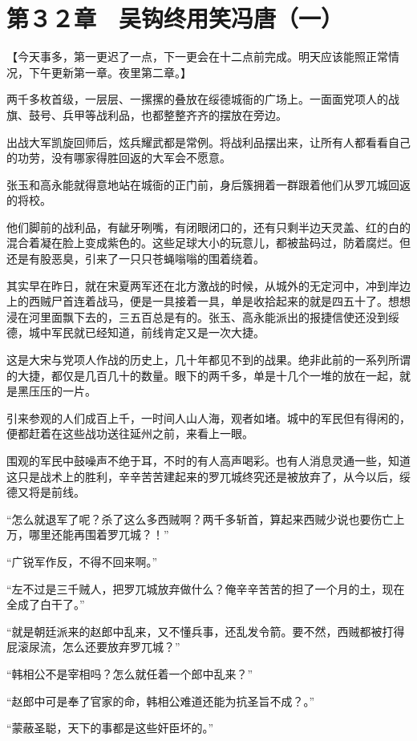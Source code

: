 \section{第３２章　吴钩终用笑冯唐（一）}

【今天事多，第一更迟了一点，下一更会在十二点前完成。明天应该能照正常情况，下午更新第一章。夜里第二章。】

两千多枚首级，一层层、一摞摞的叠放在绥德城衙的广场上。一面面党项人的战旗、鼓号、兵甲等战利品，也都整整齐齐的摆放在旁边。

出战大军凯旋回师后，炫兵耀武都是常例。将战利品摆出来，让所有人都看看自己的功劳，没有哪家得胜回返的大军会不愿意。

张玉和高永能就得意地站在城衙的正门前，身后簇拥着一群跟着他们从罗兀城回返的将校。

他们脚前的战利品，有龇牙咧嘴，有闭眼闭口的，还有只剩半边天灵盖、红的白的混合着凝在脸上变成紫色的。这些足球大小的玩意儿，都被盐码过，防着腐烂。但还是有股恶臭，引来了一只只苍蝇嗡嗡的围着绕着。

其实早在昨日，就在宋夏两军还在北方激战的时候，从城外的无定河中，冲到岸边上的西贼尸首连着战马，便是一具接着一具，单是收拾起来的就是四五十了。想想浸在河里面飘下去的，三五百总是有的。张玉、高永能派出的报捷信使还没到绥德，城中军民就已经知道，前线肯定又是一次大捷。

这是大宋与党项人作战的历史上，几十年都见不到的战果。绝非此前的一系列所谓的大捷，都仅是几百几十的数量。眼下的两千多，单是十几个一堆的放在一起，就是黑压压的一片。

引来参观的人们成百上千，一时间人山人海，观者如堵。城中的军民但有得闲的，便都赶着在这些战功送往延州之前，来看上一眼。

围观的军民中鼓噪声不绝于耳，不时的有人高声喝彩。也有人消息灵通一些，知道这只是战术上的胜利，辛辛苦苦建起来的罗兀城终究还是被放弃了，从今以后，绥德又将是前线。

“怎么就退军了呢？杀了这么多西贼啊？两千多斩首，算起来西贼少说也要伤亡上万，哪里还能再围着罗兀城？！”

“广锐军作反，不得不回来啊。”

“左不过是三千贼人，把罗兀城放弃做什么？俺辛辛苦苦的担了一个月的土，现在全成了白干了。”

“就是朝廷派来的赵郎中乱来，又不懂兵事，还乱发令箭。要不然，西贼都被打得屁滚尿流，怎么还要放弃罗兀城？”

“韩相公不是宰相吗？怎么就任着一个郎中乱来？”

“赵郎中可是奉了官家的命，韩相公难道还能为抗圣旨不成？。”

“蒙蔽圣聪，天下的事都是这些奸臣坏的。”

